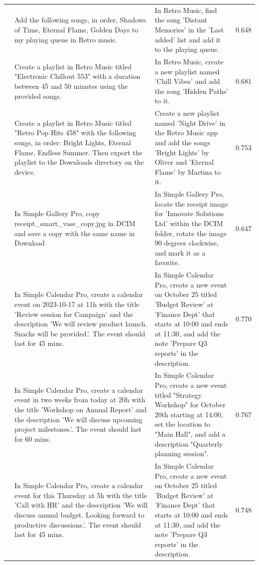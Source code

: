\documentclass{article} %
\begin{document}
\begin{scriptsize}
\begin{longtable}{@{} c >{\raggedright\arraybackslash}p{} >{\raggedright\arraybackslash}p{} c @{}}
\addlinespace[2pt]
60 & Add the following songs, in order, Shadows of Time, Eternal Flame, Golden Days to my playing queue in Retro music. & In Retro Music, find the song 'Distant Memories' in the 'Last added' list and add it to the playing queue. & 0.648 \\
\addlinespace[2pt]
61 & Create a playlist in Retro Music titled "Electronic Chillout 553" with a duration between 45 and 50 minutes using the provided songs. & In Retro Music, create a new playlist named 'Chill Vibes' and add the song 'Hidden Paths' to it. & 0.681 \\
\addlinespace[2pt]
62 & Create a playlist in Retro Music titled "Retro Pop Hits 458" with the following songs, in order: Bright Lights, Eternal Flame, Endless Summer. Then export the playlist to the Downloads directory on the device. & Create a new playlist named 'Night Drive' in the Retro Music app and add the songs 'Bright Lights' by Oliver and 'Eternal Flame' by Martina to it. & 0.753 \\
\addlinespace[2pt]
63 & In Simple Gallery Pro, copy receipt\_smart\_vase\_copy.jpg in DCIM and save a copy with the same name in Download & In Simple Gallery Pro, locate the receipt image for 'Innovate Solutions Ltd' within the DCIM folder, rotate the image 90 degrees clockwise, and mark it as a favorite. & 0.647 \\
\addlinespace[2pt]
64 & In Simple Calendar Pro, create a calendar event on 2023-10-17 at 11h with the title 'Review session for Campaign' and the description 'We will review product launch. Snacks will be provided.'. The event should last for 45 mins. & In Simple Calendar Pro, create a new event on October 25 titled 'Budget Review' at 'Finance Dept' that starts at 10:00 and ends at 11:30, and add the note 'Prepare Q3 reports' in the description. & 0.770 \\
\addlinespace[2pt]
65 & In Simple Calendar Pro, create a calendar event in two weeks from today at 20h with the title 'Workshop on Annual Report' and the description 'We will discuss upcoming project milestones.'. The event should last for 60 mins. & In Simple Calendar Pro, create a new event titled "Strategy Workshop" for October 20th starting at 14:00, set the location to "Main Hall", and add a description "Quarterly planning session". & 0.767 \\
\addlinespace[2pt]
66 & In Simple Calendar Pro, create a calendar event for this Thursday at 5h with the title 'Call with HR' and the description 'We will discuss annual budget. Looking forward to productive discussions.'. The event should last for 45 mins. & In Simple Calendar Pro, create a new event on October 25 titled 'Budget Review' at 'Finance Dept' that starts at 10:00 and ends at 11:30, and add the note 'Prepare Q3 reports' in the description. & 0.748 \\

\end{longtable}
\end{scriptsize}
\end{document}
